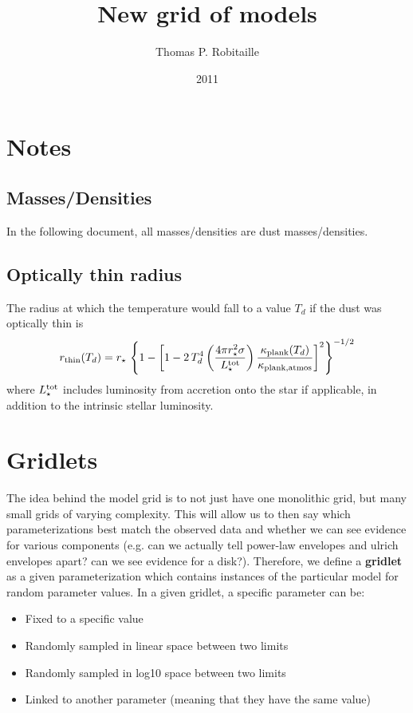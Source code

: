 \documentclass[10pt]{article}
\begin{document}
\title{New grid of models}
\author{Thomas P. Robitaille}
\date{2011}
\maketitle

\section{Notes}

\subsection{Masses/Densities}

In the following document, all masses/densities are dust masses/densities.

\subsection{Optically thin radius}

The radius at which the temperature would fall to a value $T_d$ if the dust was optically thin is
$$
r_{\rm thin}(T_d) = r_{\star} \, \left\{1-\left[1-2\,T_d^4\left(\frac{4\pi r_\star^2\sigma}{L_\star^{\rm tot}}\right)\frac{\kappa_{\rm plank}(T_d)}{\kappa_{\rm plank, atmos}}\right]^2\right\} ^ {-1/2}
$$
where $L_\star^{\rm tot}$ includes luminosity from accretion onto the star if applicable, in addition to the intrinsic stellar luminosity.

\section{Gridlets}

The idea behind the model grid is to not just have one monolithic grid, but many small grids of varying complexity. This will allow us to then say which parameterizations best match the observed data and whether we can see evidence for various components (e.g. can we actually tell power-law envelopes and ulrich envelopes apart? can we see evidence for a disk?). Therefore, we define a \textbf{gridlet} as a given parameterization which contains instances of the particular model for random parameter values. In a given gridlet, a specific parameter can be:

\begin{itemize}
\item Fixed to a specific value
\item Randomly sampled in linear space between two limits
\item Randomly sampled in log10 space between two limits
\item Linked to another parameter (meaning that they have the same value)
\end{itemize}
\end{document}
